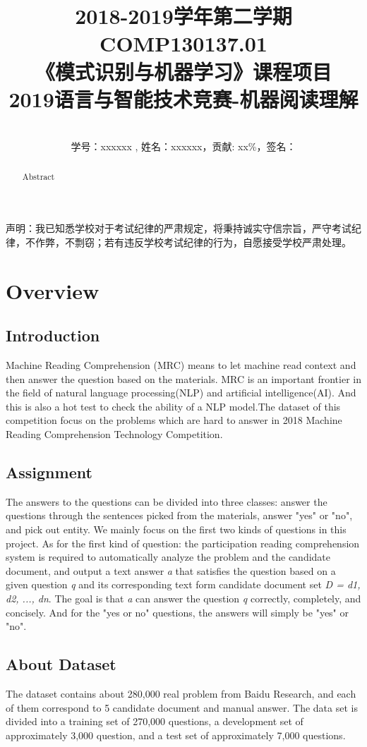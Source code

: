 \documentclass{article}
\title{2018-2019学年第二学期COMP130137.01\\
《模式识别与机器学习》课程项目\\
2019语言与智能技术竞赛-机器阅读理解}
\author{\\
学号：xxxxxx , 姓名：xxxxxx，贡献: xx\%，签名：}
\begin{document}
\begin{center}
  声明：我已知悉学校对于考试纪律的严肃规定，将秉持诚实守信宗旨，严守考试纪律，不作弊，不剽窃；若有违反学校考试纪律的行为，自愿接受学校严肃处理。
\end{center}
\maketitle

\begin{abstract}
   Abstract
\end{abstract}

\section{Overview}
\subsection{Introduction}
Machine Reading Comprehension (MRC) means to let machine read context and then answer the question based on the materials. MRC is an important frontier in the field of natural language processing(NLP) and artificial intelligence(AI). And this is also a hot test to check the ability of a NLP model.The dataset of this competition focus on the problems which are hard to answer in 2018 Machine Reading Comprehension Technology Competition. 

\subsection{Assignment}
The answers to the questions can be divided into three classes: answer the questions through the sentences picked from the materials, answer "yes" or "no", and pick out entity. We mainly focus on the first two kinds of questions in this project. 
As for the first kind of question: the participation reading comprehension system is required to automatically analyze the problem and the candidate document, and output a text answer \emph{a} that satisfies the question based on a given question \emph{q} and its corresponding text form candidate document set \emph{D = d1, d2, ..., dn}. The goal is that \emph{a} can answer the question \emph{q} correctly, completely, and concisely.
And for the "yes or no" questions, the answers will simply be "yes" or "no".

\subsection{About Dataset}
The dataset contains about 280,000 real problem from Baidu Research, and each of them correspond to 5 candidate document and manual answer. The data set is divided into a training set of 270,000 questions, a development set of approximately 3,000 question, and a test set of approximately 7,000 questions.
\end{document}
